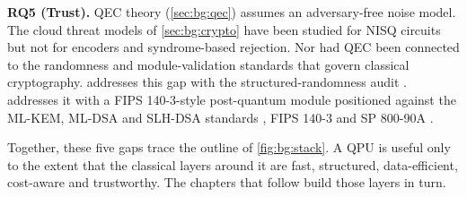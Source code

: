 \textbf{RQ5 (Trust).} QEC theory (\cref{sec:bg:qec}) assumes an adversary-free noise model. The cloud threat models of \cref{sec:bg:crypto} have been studied for NISQ circuits but not for encoders and syndrome-based rejection. Nor had QEC been connected to the randomness and module-validation standards that govern classical cryptography.  addresses this gap with the structured-randomness audit \cite{guo2026qecaudit}.  addresses it with a FIPS 140-3-style post-quantum module \cite{guo2026lightriderqpc} positioned against the ML-KEM, ML-DSA and SLH-DSA standards \cite{nist2024fips203,nist2024fips204,nist2024fips205}, FIPS 140-3 \cite{nist2019fips1403} and SP 800-90A \cite{nist2015sp80090a}.

Together, these five gaps trace the outline of \cref{fig:bg:stack}. A QPU is useful only to the extent that the classical layers around it are fast, structured, data-efficient, cost-aware and trustworthy. The chapters that follow build those layers in turn.

